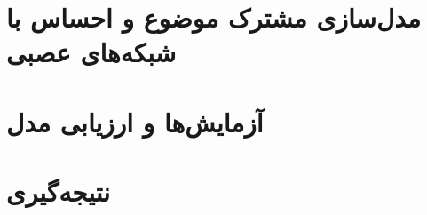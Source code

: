 \documentclass[12pt,a4paper]{article}
\begin{document}
\section{مدل‌سازی مشترک موضوع و احساس با شبکه‌های عصبی}	
\section{آزمایش‌ها و ارزیابی مدل}
\section{نتیجه‌گیری}

\newpage


\end{document}
